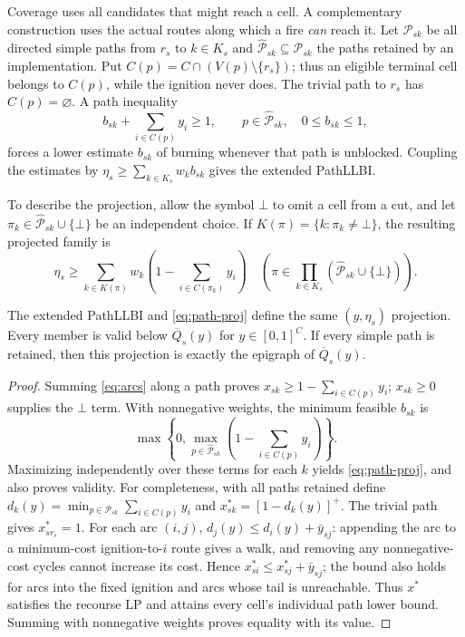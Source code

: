 Coverage uses all candidates that might reach a cell. A complementary
construction uses the actual routes along which a fire \emph{can} reach
it. Let $\mathcal P_{sk}$ be all directed simple paths from $r_s$ to
$k\in K_s$ and $\widehat{\mathcal P}_{sk}\subseteq\mathcal P_{sk}$
the paths retained by an implementation. Put
$C(p)=C\cap(V(p)\setminus\{r_s\})$; thus an eligible terminal cell
belongs to $C(p)$, while the ignition never does. The trivial path to
$r_s$ has $C(p)=\varnothing$. A path inequality
\begin{equation}\label{eq:path-atom}
 b_{sk}+\sum_{i\in C(p)}y_i\ge1,
 \qquad p\in\widehat{\mathcal P}_{sk},\quad 0\le b_{sk}\le1,
\end{equation}
forces a lower estimate $b_{sk}$ of burning whenever that path is
unblocked. Coupling the estimates by
$\eta_s\ge\sum_{k\in K_s}w_kb_{sk}$ gives the extended PathLLBI.

To describe the projection, allow the symbol $\bot$ to omit a cell from a
cut, and let $\pi_k\in\widehat{\mathcal P}_{sk}\cup\{\bot\}$ be an
independent choice. If $K(\pi)=\{k:\pi_k\ne\bot\}$, the resulting
projected family is
\begin{equation}\label{eq:path-proj}
 \eta_s\ge\sum_{k\in K(\pi)}w_k
       \left(1-\sum_{i\in C(\pi_k)}y_i\right)
 \quad\left(\pi\in\prod_{k\in K_s}
        (\widehat{\mathcal P}_{sk}\cup\{\bot\})\right).
\end{equation}

\begin{proposition}
\label{prop:path}
The extended PathLLBI and \eqref{eq:path-proj} define the same
$(y,\eta_s)$ projection. Every member is valid below
$\overline Q_s(y)$ for $y\in[0,1]^C$. If every simple path is retained,
then this projection is exactly the epigraph of
$\overline Q_s(y)$.
\end{proposition}
\begin{proof}
Summing \eqref{eq:arcs} along a path proves
$x_{sk}\ge1-\sum_{i\in C(p)}y_i$; $x_{sk}\ge0$ supplies the
$\bot$ term. With nonnegative weights, the minimum feasible $b_{sk}$ is
\[
 \max\left\{0,\max_{p\in\widehat{\mathcal P}_{sk}}
       \left(1-\sum_{i\in C(p)}y_i\right)\right\}.
\]
Maximizing independently over these terms for each $k$ yields
\eqref{eq:path-proj}, and also proves validity. For completeness, with
all paths retained define $d_k(y)=\min_{p\in\mathcal P_{sk}}
\sum_{i\in C(p)}y_i$ and $x_{sk}^*=[1-d_k(y)]^+$.
The trivial path gives $x_{sr_s}^*=1$. For each arc $(i,j)$,
$d_j(y)\le d_i(y)+\bar y_{sj}$: appending the arc to a minimum-cost
ignition-to-$i$ route gives a walk, and removing any nonnegative-cost
cycles cannot increase its cost. Hence $x_{si}^*\le
x_{sj}^*+\bar y_{sj}$; the bound also holds for arcs into the fixed
ignition and arcs whose tail is unreachable. Thus $x^*$ satisfies the
recourse LP and attains every cell's individual path lower bound.
Summing with nonnegative weights proves equality with its value.
\end{proof}

